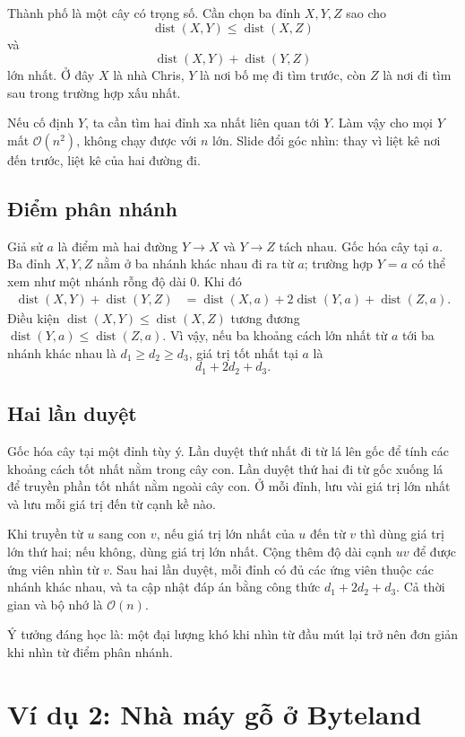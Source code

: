 \documentclass[11pt]{article}
\newcommand{\Oh}{\mathcal{O}}
\newcommand{\dist}{\operatorname{dist}}
\begin{document}
Thành phố là một cây có trọng số. Cần chọn ba đỉnh \(X,Y,Z\) sao cho
\[
  \dist(X,Y)\le \dist(X,Z)
\]
và
\[
  \dist(X,Y)+\dist(Y,Z)
\]
lớn nhất. Ở đây \(X\) là nhà Chris, \(Y\) là nơi bố mẹ đi tìm trước, còn
\(Z\) là nơi đi tìm sau trong trường hợp xấu nhất.

Nếu cố định \(Y\), ta cần tìm hai đỉnh xa nhất liên quan tới \(Y\). Làm vậy
cho mọi \(Y\) mất \(\Oh(n^2)\), không chạy được với \(n\) lớn. Slide đổi góc
nhìn: thay vì liệt kê nơi đến trước, liệt kê  của hai
đường đi.

\subsection{Điểm phân nhánh}

Giả sử \(a\) là điểm mà hai đường \(Y\to X\) và \(Y\to Z\) tách nhau. Gốc hóa
cây tại \(a\). Ba đỉnh \(X,Y,Z\) nằm ở ba nhánh khác nhau đi ra từ \(a\);
trường hợp \(Y=a\) có thể xem như một nhánh rỗng độ dài \(0\). Khi đó
\[
\begin{aligned}
  \dist(X,Y)+\dist(Y,Z)
  &=\dist(X,a)+2\dist(Y,a)+\dist(Z,a).
\end{aligned}
\]
Điều kiện \(\dist(X,Y)\le\dist(X,Z)\) tương đương
\(\dist(Y,a)\le\dist(Z,a)\). Vì vậy, nếu ba khoảng cách lớn nhất từ \(a\) tới
ba nhánh khác nhau là \(d_1\ge d_2\ge d_3\), giá trị tốt nhất tại \(a\) là
\[
  d_1+2d_2+d_3.
\]

\subsection{Hai lần duyệt}

Gốc hóa cây tại một đỉnh tùy ý. Lần duyệt thứ nhất đi từ lá lên gốc để tính
các khoảng cách tốt nhất nằm trong cây con. Lần duyệt thứ hai đi từ gốc xuống
lá để truyền phần tốt nhất nằm ngoài cây con. Ở mỗi đỉnh, lưu vài giá trị lớn
nhất và lưu mỗi giá trị đến từ cạnh kề nào.

Khi truyền từ \(u\) sang con \(v\), nếu giá trị lớn nhất của \(u\) đến từ
\(v\) thì dùng giá trị lớn thứ hai; nếu không, dùng giá trị lớn nhất. Cộng
thêm độ dài cạnh \(uv\) để được ứng viên nhìn từ \(v\). Sau hai lần duyệt,
mỗi đỉnh có đủ các ứng viên thuộc các nhánh khác nhau, và ta cập nhật đáp án
bằng công thức \(d_1+2d_2+d_3\). Cả thời gian và bộ nhớ là \(\Oh(n)\).

Ý tưởng đáng học là: một đại lượng khó khi nhìn từ đầu mút lại trở nên đơn
giản khi nhìn từ điểm phân nhánh.

\section{Ví dụ 2: Nhà máy gỗ ở Byteland}
\end{document}
